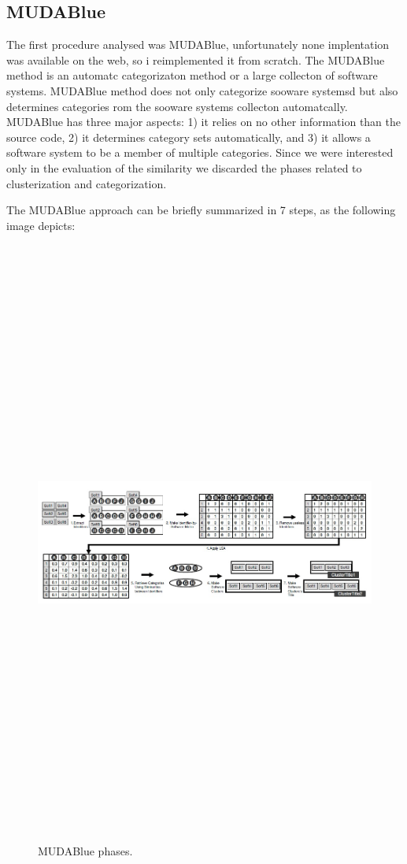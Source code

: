 
\subsection{MUDABlue}\label{sec:mudablue}

The first procedure analysed was MUDABlue, unfortunately none implentation was available on the web, so i reimplemented it from scratch. The MUDABlue method is an automatc categorizaton method or a large collecton of software systems. MUDABlue method does not only categorize sooware systemsd but also determines categories rom the sooware systems collecton automatcally. MUDABlue has three major aspects: 1) it relies on no other information than the source code, 2) it determines category sets automatically, and 3) it allows a software system to be a member of multiple categories. Since we were interested only in the evaluation of the similarity we discarded the phases related to clusterization and categorization.

The MUDABlue approach can be briefly summarized in 7 steps, as the following image depicts:

\begin{figure}[H]
\includegraphics[width=15cm,height=20cm,keepaspectratio]{images/Mudablue1.png}
\centering
\caption{MUDABlue phases.}
\end{figure}

